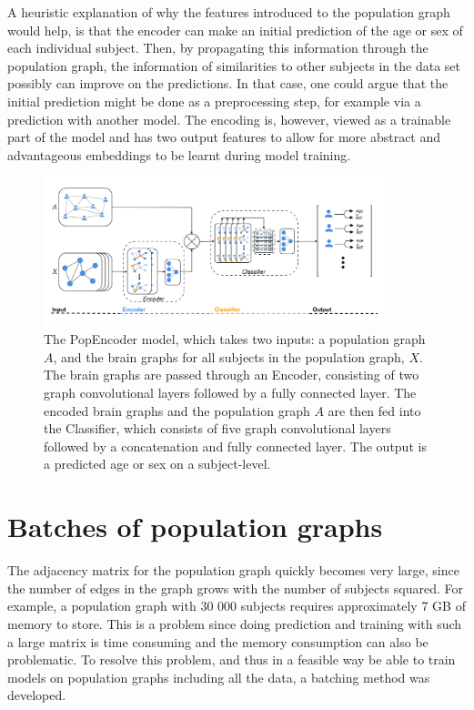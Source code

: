A heuristic explanation of why the features introduced to the population graph would help, is that the encoder can make an initial prediction of the age or sex of each individual subject. Then, by propagating this information through the population graph, the information of similarities to other subjects in the data set possibly can improve on the predictions. In that case, one could argue that the initial prediction might be done as a preprocessing step, for example via a prediction with another model. The encoding is, however, viewed as a trainable part of the model and has two output features to allow for more abstract and advantageous embeddings to be learnt during model training. 



\begin{figure}[H]
    \centering
    \includegraphics[width=0.9\textwidth]{chapters/images_methods/popencoder_v2.png}
    \caption{The PopEncoder model, which takes two inputs: a population graph $A$, and the brain graphs for all subjects in the population graph, $X$. The brain graphs are passed through an Encoder, consisting of two graph convolutional layers followed by a fully connected layer. The encoded brain graphs and the population graph $A$ are then fed into the Classifier, which consists of five graph convolutional layers followed by a concatenation and fully connected layer. The output is a predicted age or sex on a subject-level.}
    \label{fig:popencoder}
\end{figure}

\section{Batches of population graphs}
The adjacency matrix for the population graph quickly becomes very large, since the number of edges in the graph grows with the number of subjects squared. For example, a population graph with 30 000 subjects requires approximately 7 GB of memory to store. This is a problem since doing prediction and training with such a large matrix is time consuming and the memory consumption can also be problematic. To resolve this problem, and thus in a feasible way be able to train models on population graphs including all the data, a batching method was developed. 


